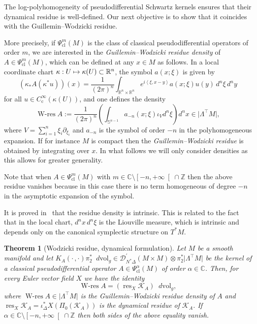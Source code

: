 \documentclass[JEP,XML,SOM,Unicode]{cedram}
\let\pazocal\mathscr
\def\mto{\mathchoice{\longmapsto}{\mapsto}{\mapsto}{\mapsto}}
\newcommand{\LtM}{\Lambda^{\!\!\top\!}M}
\newtheorem{theorem}{Theorem}[section]
\theoremstyle{definition}
\renewcommand\c{\mathrm{c}}
\newcommand{\ph}{\mathrm{cl}}
\let\cv\alpha
\let\asigma a
\let\euler X
\DeclareMathOperator{\wres}{{\scriptstyle W}-res}
\DeclareMathOperator{\resnorm}{res}
\newcommand{\resdyn}{{\resnorm_\euler}}
\newcommand*{\defeq}{:=}
\newcommand{\clopen}[1]{\mathopen{}\mathclose{\left[#1 \right[}}
\newcommand\dvol{\mathop{}\!d\mathrm{vol}}
\begin{document}
\label{ss:wodzicki}

The log-polyhomogeneity of pseudodifferential Schwartz kernels ensures that their dynamical residue is well-defined. Our next objective is to show that it coincides with the Guillemin--Wodzicki residue.

More precisely, if $\Psi^m_\ph(M)$ is the class of classical pseudodifferential operators of order $m$, we are interested in the \emph{Guillemin--Wodzicki residue density} of $A\in\Psi^m_\ph(M)$, which can be defined at any $x\in M$ as follows. In a local coordinate chart $\kappa:U\mto \kappa(U)\subset \mathbb{R}^n$, the symbol $a(x;\xi)$ is given by
\[
\left(\kappa_{*} A\left(\kappa^*u\right)\right)(x)=\frac{1}{(2\pi)^n} \int_{\mathbb{R}^n\times \mathbb{R}^n} e^{i\left\langle\xi,x-y\right\rangle}\asigma(x;\xi)u(y)\, d^n\xi\, d^ny
\]
for all $u\in C^\infty_\c\left(\kappa\left(U\right)\right)$, and one defines the density
\[
\wres A\defeq \frac{1}{(2\pi)^n}\left(\int_{\mathbb{S}^{n-1}} \asigma_{-n}(x;\xi) \iota_{V} d^n\xi\right)d^nx \in \vert\LtM \vert,
\]
where $V=\sum_{i=1}^n\xi_i\partial_{\xi_i}$ and $\asigma_{-n}$ is the symbol of order $-n$ in the polyhomogeneous expansion.
If for instance $M$ is compact then the \emph{Guillemin--Wodzicki residue} is obtained by integrating over $x$. In what follows we will only consider densities as this allows for greater generality.

Note that when $A\in \Psi_\ph^m(M)$ with $m\in \mathbb{C}\setminus \clopen{-n,+\infty}\cap \mathbb{Z}$
then the above residue vanishes because in this case there is no term homogeneous of degree $-n$ in the asymptotic expansion of the symbol.

It is proved in~\cite[Prop.\,4.5]{Lesch} that the residue density is intrinsic. This is related to the fact that in the local chart, $d^nx\,d^n\xi$ is the Liouville measure, which is intrinsic and depends only on the canonical symplectic structure on $T^*M$.

\begin{theorem}[Wodzicki residue, dynamical formulation]\label{wodzickipdo}
Let $M$ be a smooth manifold and let $K_{A}(\cdot\,,\cdot)\pi_2^*\dvol_g\in \pazocal{D}^\prime_{N^*\Delta}(M\times M)\otimes \pi_2^*\vert \LtM \vert$ be the kernel of a classical pseudodifferential operator $A\in \Psi^\cv_{\ph}(M)$ of order {$\cv\in \mathbb{C}$}.
Then, for every Euler vector field $\euler$ we have the identity
\begin{equation} \label{toprove}
\wres A= (\resdyn {\pazocal{K}_{A}}) \dvol_g,
\end{equation}
where $\wres A\in\vert\LtM \vert$ is the Guillemin--Wodzicki residue density of $A$ and $\resdyn {\pazocal{K}_{A}}=\iota_\Delta^* \euler (\Pi_0 ({\pazocal{K}_{A}}))$ is the dynamical residue of ${\pazocal{K}_{A}}$. If $\cv\in \mathbb{C}\setminus \clopen{-n,+\infty}\cap \mathbb{Z}$
then both sides of the above equality vanish.
\end{theorem}
\end{document}
